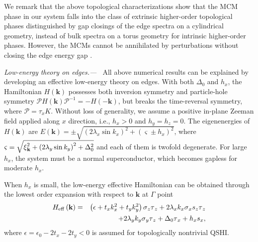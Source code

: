 \documentclass[twocolumn,prl,floatfix,citeautoscript,nofootinbib,superscriptaddress]{revtex4}
\begin{document}
We remark that the above topological characterizations show that the MCM
phase in our system falls into the class of extrinsic higher-order
topological phases distinguished by gap closings of the edge spectra \cite%
{Khalaf19} on a cylindrical geometry, instead of bulk spectra on a torus
geometry for intrinsic higher-order phases. However, the MCMs cannot be
annihilated by perturbations without closing the edge energy gap \cite{SM}.

{\color{blue}\emph{Low-energy theory on edges.{---} \ }}All above numerical
results can be explained by developing an effective low-energy theory on
edges. With both $\Delta _{0}$ and $h_{x}$, the Hamiltonian $H(\mathbf{k})$
possesses both inversion symmetry and particle-hole symmetry $\mathcal{P}H(%
\mathbf{k})\mathcal{P}^{-1}=-H(-\mathbf{k})$, but breaks the time-reversal
symmetry, where $\mathcal{P}=\tau _{x}K$. Without loss of generality, we
assume a positive in-plane Zeeman field applied along $x$ direction, i.e., $%
h_{x}>0$ and $h_{y}=h_{z}=0$. The eigenenergies of $H(\mathbf{k})$ are $%
E\left( \mathbf{k}\right) =\pm \sqrt{\left( 2\lambda _{x}\sin k_{x}\right)
^{2}+\left( \varsigma \pm h_{x}\right) ^{2}}$, where $\varsigma =\sqrt{\xi _{%
\mathbf{k}}^{2}+\left( 2\lambda _{y}\sin k_{y}\right) ^{2}+\Delta _{0}^{2}}$
and each of them is twofold degenerate. For large $h_{x}$, the system must
be a normal superconductor, which becomes gapless for moderate $h_{x}$.

When $h_{x}$ is small, the low-energy effective Hamiltonian can be obtained
through the lowest order expansion with respect to $\mathbf{k}$ at $\Gamma $
point
\begin{eqnarray}
H_{\mathrm{eff}}\left( \mathbf{k}\right) &=&\left( \epsilon
+t_{x}k_{x}^{2}+t_{y}k_{y}^{2}\right) \sigma _{z}\tau _{z}+2\lambda
_{x}k_{x}\sigma _{x}s_{z}\tau _{z}  \notag \\
&&+2\lambda _{y}k_{y}\sigma _{y}\tau _{z}+\Delta _{0}\tau _{x}+h_{x}s_{x},
\label{Ham2}
\end{eqnarray}%
where $\epsilon =\epsilon _{0}-2t_{x}-2t_{y}<0$ is assumed for topologically
nontrivial QSHI.
\end{document}

